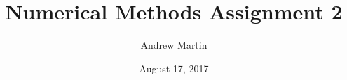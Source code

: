 \documentclass[a4paper]{article}
\begin{document}
	\title{Numerical Methods Assignment 2}
	\date{August 17, 2017}
	\author{Andrew Martin}
	\maketitle
	
	
	
	
\end{document}
